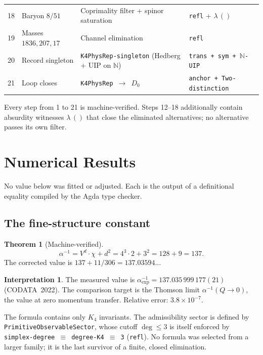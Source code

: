 \documentclass[11pt,a4paper]{article}
\theoremstyle{definition}
\newtheorem{theorem}{Theorem}[section]
\newtheorem*{interpretation}{Interpretation}
\begin{document}
\begin{center}
\begin{tabular}{@{}rlp{5.5cm}p{3.5cm}@{}}
18 & Baryon $8/51$          & Coprimality filter + spinor saturation & \texttt{refl} + $\lambda\,()$ \\
19 & Masses $1836, 207, 17$ & Channel elimination & \texttt{refl} \\
20 & Record singleton        & \texttt{K4PhysRep-singleton} (Hedberg + UIP on $\mathbb{N}$) & \texttt{trans + sym + $\mathbb{N}$-UIP} \\
21 & Loop closes             & \texttt{K4PhysRep}~$\to$~$D_0$ & \texttt{anchor + Two-distinction} \\
\bottomrule
\end{tabular}
\end{center}

\noindent
Every step from 1 to 21 is machine-verified.  Steps 12--18 additionally
contain absurdity witnesses $\lambda\,()$ that close the eliminated
alternatives; no alternative passes its own filter.

\section{Numerical Results}
\label{sec:numbers}

No value below was fitted or adjusted.  Each is the output of a definitional
equality compiled by the Agda type checker.

\subsection{The fine-structure constant}

\begin{theorem}[Machine-verified]
\[
  \alpha^{-1} = V^d \cdot \chi + d^2 = 4^3 \cdot 2 + 3^2 = 128 + 9 = 137.
\]
The corrected value is $137 + 11/306 = 137.03594\ldots$
\end{theorem}

\begin{interpretation}
The measured value is $\alpha^{-1}_{\mathrm{exp}} = 137.035\,999\,177(21)$
(CODATA~2022).  The comparison target is the Thomson limit
$\alpha^{-1}(Q \to 0)$, the value at zero momentum transfer.
Relative error: $3.8 \times 10^{-7}$.

The formula contains only $K_4$ invariants.  The admissibility sector is
defined by \texttt{PrimitiveObservableSector}, whose cutoff $\deg \le 3$ is
itself enforced by \texttt{simplex-degree $\equiv$ degree-K4 $\equiv$ 3}
(\texttt{refl}).  No formula was selected from a larger family; it is the
last survivor of a finite, closed elimination.
\end{interpretation}
\end{document}

